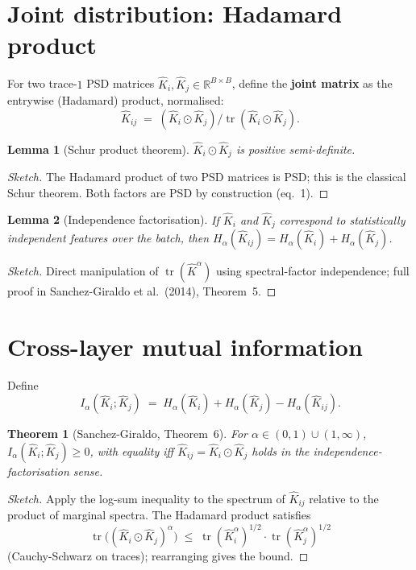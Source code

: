 \documentclass[11pt,a4paper]{article}
\newtheorem{lemma}{Lemma}
\newtheorem{theorem}{Theorem}
\newcommand{\trace}{\operatorname{tr}}
\newcommand{\Khat}{\hat{K}}
\begin{document}
\section{Joint distribution: Hadamard product}

For two trace-$1$ PSD matrices $\Khat_i, \Khat_j \in \mathbb{R}^{B
\times B}$, define the \textbf{joint matrix} as the entrywise (Hadamard)
product, normalised:
\begin{equation}
\Khat_{ij} \;=\; (\Khat_i \odot \Khat_j) /
                   \trace(\Khat_i \odot \Khat_j). \tag{5}
\end{equation}

\begin{lemma}[Schur product theorem]
$\Khat_i \odot \Khat_j$ is positive semi-definite.
\end{lemma}
\begin{proof}[Sketch]
The Hadamard product of two PSD matrices is PSD; this is the classical
Schur theorem. Both factors are PSD by construction (eq.~1).
\end{proof}

\begin{lemma}[Independence factorisation]
If $\Khat_i$ and $\Khat_j$ correspond to statistically independent
features over the batch, then $H_\alpha(\Khat_{ij}) = H_\alpha(\Khat_i) +
H_\alpha(\Khat_j)$.
\end{lemma}
\begin{proof}[Sketch]
Direct manipulation of $\trace(\Khat^\alpha)$ using
spectral-factor independence; full proof in Sanchez-Giraldo et al.\
(2014), Theorem~5.
\end{proof}

\section{Cross-layer mutual information}

Define
\begin{equation}
I_\alpha(\Khat_i ; \Khat_j) \;=\; H_\alpha(\Khat_i) + H_\alpha(\Khat_j)
                                  - H_\alpha(\Khat_{ij}). \tag{6}
\end{equation}

\begin{theorem}[Sanchez-Giraldo, Theorem~6]
For $\alpha \in (0,1) \cup (1, \infty)$, $I_\alpha(\Khat_i ; \Khat_j)
\geq 0$, with equality iff $\Khat_{ij} = \Khat_i \odot \Khat_j$ holds in
the independence-factorisation sense.
\end{theorem}
\begin{proof}[Sketch]
Apply the log-sum inequality to the spectrum of $\Khat_{ij}$ relative
to the product of marginal spectra. The Hadamard product satisfies
\[
\trace\bigl((\Khat_i \odot \Khat_j)^\alpha\bigr)
   \;\leq\; \trace(\Khat_i^\alpha)^{1/2} \cdot \trace(\Khat_j^\alpha)^{1/2}
\]
(Cauchy-Schwarz on traces); rearranging gives the bound.
\end{proof}
\end{document}
